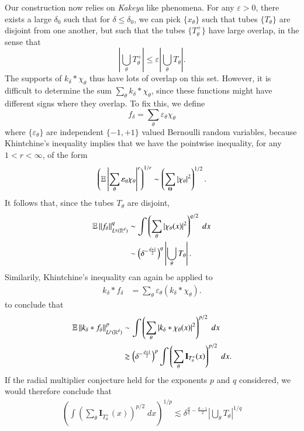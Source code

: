 Our construction now relies on \emph{Kakeya} like phenomena. For any $\varepsilon > 0$, there exists a large $\delta_0$ such that for $\delta \leq \delta_0$, we can pick $\{ x_\theta \}$ such that tubes $\{ T_\theta \}$ are disjoint from one another, but such that the tubes $\{ T_\theta^+ \}$ have large overlap, in the sense that
%
\[ | \bigcup_\theta T_\theta^+ | \leq \varepsilon | \bigcup_\theta T_\theta|. \]
%
The supports of $k_\delta * \chi_\theta$ thus have lots of overlap on this set. However, it is difficult to determine the sum $\sum_\theta k_\delta * \chi_\theta$, since these functions might have different signs where they overlap. To fix this, we define
%
\[ f_\delta = \sum_\theta \varepsilon_\theta \chi_\theta \]
%
where $\{ \varepsilon_\theta \}$ are independent $\{ -1, +1 \}$ valued Bernoulli random variables, because Khintchine's inequality implies that we have the pointwise inequality, for any $1 < r < \infty$, of the form
%
\[ \left( \operatorname{\mathbb{E}} \left| \sum_\theta \varepsilon_\theta \chi_\theta \right|^r \right)^{1/r} \sim \left( \sum_\Theta |\chi_\theta|^2 \right)^{1/2}. \]
%
It follows that, since the tubes $T_\theta$ are disjoint,
%
\begin{align*}
    \operatorname{\mathbb{E}} \| f_\delta \|_{L^q(\operatorname{\mathbb{R}}^d)}^q &\sim \int \left( \sum_\theta |\chi_\theta(x)|^2 \right)^{q/2}\; dx\\
    &\sim \left( \delta^{- \frac{d+1}{2}} \right)^q \left| \bigcup_\theta T_\theta \right|.
\end{align*}
%
Similarily, Khintchine's inequality can again be applied to
%
\begin{align*}
    k_\delta * f_\delta &= \sum_\theta \varepsilon_\theta (k_\delta * \chi_\theta).
\end{align*}
%
to conclude that
%
\begin{align*}
    \operatorname{\mathbb{E}} \| k_\delta * f_\delta \|_{L^p(\operatorname{\mathbb{R}}^d)}^p &\sim \int \left( \sum_\theta |k_\delta * \chi_\theta(x)|^2 \right)^{p/2}\; dx\\
    &\gtrsim \left( \delta^{- \frac{d+1}{2}} \right)^p \int \left( \sum_\theta \mathbf{I}_{T_\theta^+}(x) \right)^{p/2}\; dx.
\end{align*}
%
If the radial multiplier conjecture held for the exponents $p$ and $q$ considered, we would therefore conclude that
%
\begin{align*}
    \left( \int \left( \sum_\theta \mathbf{I}_{T_\theta^+}(x) \right)^{p/2}\; dx \right)^{1/p} \lesssim \delta^{\frac{d}{q} - \frac{d-1}{2}} \left| \bigcup_\theta T_\theta \right|^{1/q}
\end{align*}
